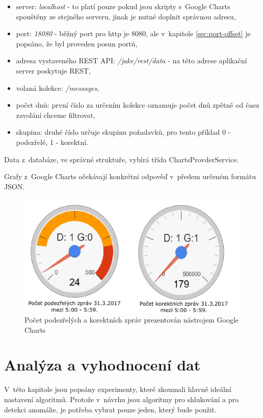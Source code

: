 \documentclass[thesis=M,czech]{FITthesis}[2012/10/20]
\newcommand{\tmpframe}[1]{\fbox{#1}}
\renewcommand{\tmpframe}[1]{#1}
\begin{document}
		\begin{itemize} 
			\item server: \textit{localhost} - to platí pouze pokud jsou skripty s~Google Charts spouštěny ze stejného serveru, jinak je nutné doplnit správnou adresu,
			\item port: \textit{18080} - běžný port pro http je 8080, ale v~kapitole \ref{sec:port-offset} je popsáno, že byl proveden posun portů,
			\item adresa vystaveného REST API: \textit{/jake/rest/data} - na této adrese aplikační server poskytuje REST,
			\item volaná kolekce: \textit{/messages},
			\item počet dnů: první číslo za určením kolekce oznamuje počet dnů zpětně od času zavolání chceme filtrovat,
			\item skupina: druhé číslo určuje skupinu požadavků, pro tento příklad 0 - podezřelé, 1 - korektní.
		\end{itemize}
		
		  
		
		Data z~databáze, ve správné struktuře, vybírá třída ChartsProvderService.
		
		Grafy z~Google Charts očekávají konkrétní odpověď v~předem určeném formátu JSON.
		
		\begin{figure}[htb]\centering
			\tmpframe{\includegraphics[width=\textwidth]{./img/gCharts}}	
			\caption{Počet podezřelých a korektních zpráv prezentován nástrojem Google Charts}
			\label{fig:gCharts}
		\end{figure}

\chapter{Analýza a vyhodnocení dat}
	\label{chap:analyse}
	V~této kapitole jsou popsány experimenty, které zkoumali hlavně ideální nastavení algoritmů. Protože v~návrhu jsou algoritmy pro shlukování a pro detekci anomálie, je potřeba vybrat pouze jeden, který bude použit.
	
\end{document}
